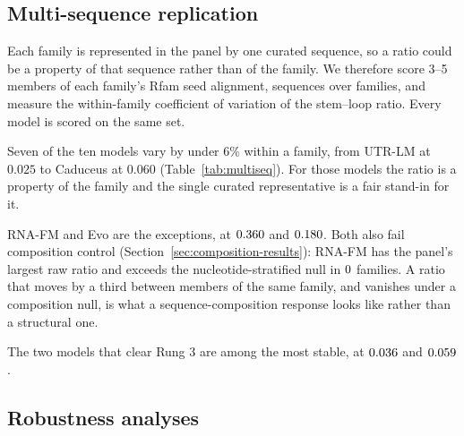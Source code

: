 \documentclass[11pt]{article}
\begin{document}
\subsection{Multi-sequence replication}
\label{sec:multiseq-results}

Each family is represented in the panel by one curated sequence, so a ratio
could be a property of that sequence rather than of the family. We therefore
score 3--5 members of each family's Rfam seed alignment, \multiseqN{} sequences
over \multiseqFamilies{} families, and measure the within-family coefficient of
variation of the stem--loop ratio. Every model is scored on the same set.



Seven of the ten models vary by under 6\% within a family, from UTR-LM at
$0.025$ to Caduceus at $0.060$ (Table~\ref{tab:multiseq}). For those models the
ratio is a property of the family and the single curated representative is a
fair stand-in for it.

RNA-FM and Evo are the exceptions, at $0.360{}$ and $0.180{}$. Both also
fail composition control (Section~\ref{sec:composition-results}): RNA-FM has the
panel's largest raw ratio and exceeds the nucleotide-stratified null in
$0{}$ families. A ratio that moves by a third between members of the
same family, and vanishes under a composition null, is what a
sequence-composition response looks like rather than a structural one.

The two models that clear Rung 3 are among the most stable, at $0.036{}$
and $0.059{}$.

\subsection{Robustness analyses}
\label{sec:robustness}
\end{document}
